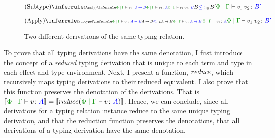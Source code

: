 \documentclass{Report}
\begin{document}
\begin{figure}[H]
\begin{framed}
        \centering
            \begin{minipage}{0.47\textwidth}
                \centering
                \begin{equation*}
                    \scalebox{.9}{$                    \ntreeruleII{\vsubtype}{
                        \scalebox{.6}{$
                        \ntreeruleII{\vapply}{\gpetyperelation{v_1}{\ab}}{\gpetyperelation{v_2}{A}}{\gpetyperelation{\apply{v_1}{v_2}}{B}}
                        $}
                    }{
                        \scalebox{.9}{$B\subtypep B'$}
                    }{
                        \gpetyperelation{\apply{v_1}{v_2}}{B'}
                    }
                    $}
                \end{equation*}
            \end{minipage}
            \quad
            \begin{minipage}{0.47\textwidth}
                \centering

                \begin{equation*}
                    \scalebox{.9}{$
                    \ntreeruleII{\vapply}{
                        \scalebox{.6}{$
                        \ntreeruleII{\vsubtype}{\gpetyperelation{v_1}{\ab}}{\ab\subtypep \fntype{A}{B'}}{\gpetyperelation{v}{\fntype{A}{B'}}}
                        $}
                    }{
                        \scalebox{.7}{$\gpetyperelation{v_2}{A}$}
                    }{
                        \gpetyperelation{\apply{v_1}{v_2}}{B'}
                    }$}
                \end{equation*}
            \end{minipage}
\end{framed}
    \caption{Two different derivations of the same typing relation.}
    \label{NonUniqueDerivations}
\end{figure}

To prove that all typing derivations have the same denotation, I first introduce the concept of a \textit{reduced} typing derivation that is unique to each term and type in each effect and type environment. Next, I present a function, $reduce$, which recursively maps  typing derivations to their reduced equivalent. I also prove that this function preserves the denotation of the derivations. That is $\deno{\gpetyperelation{v}{A}} = \deno{\reduce(\gpetyperelation{v}{A})}$. Hence, we can conclude, since all derivations for a typing relation instance reduce to the same unique typing derivation, and that the reduction function preserves the denotations, that all derivations of a typing derivation have the same denotation.
\end{document}
